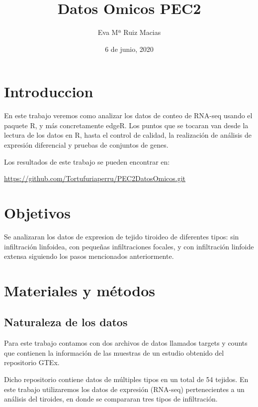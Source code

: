 \documentclass[
]{article}
\title{Datos Omicos PEC2}
\author{Eva Mª Ruiz Macias}
\date{6 de junio, 2020}
\begin{document}
\maketitle

{
\setcounter{tocdepth}{2}
\tableofcontents
}
\hypertarget{introduccion}{%
\section{Introduccion}\label{introduccion}}

En este trabajo veremos como analizar los datos de conteo de RNA-seq
usando el paquete R, y más concretamente edgeR. Los puntos que se
tocaran van desde la lectura de los datos en R, hasta el control de
calidad, la realización de análisis de expresión diferencial y pruebas
de conjuntos de genes.

Los resultados de este trabajo se pueden encontrar en:

\url{https://github.com/Tortufuriaperru/PEC2DatosOmicos.git}

\hypertarget{objetivos}{%
\section{Objetivos}\label{objetivos}}

Se analizaran los datos de expresion de tejido tiroideo de diferentes
tipos: sin infiltración linfoidea, con pequeñas infiltraciones focales,
y con infiltración linfoide extensa siguiendo los pasos mencionados
anteriormente.

\hypertarget{materiales-y-muxe9todos}{%
\section{Materiales y métodos}\label{materiales-y-muxe9todos}}

\hypertarget{naturaleza-de-los-datos}{%
\subsection{Naturaleza de los datos}\label{naturaleza-de-los-datos}}

Para este trabajo contamos con dos archivos de datos llamados targets y
counts que contienen la información de las muestras de un estudio
obtenido del repositorio GTEx.

Dicho repositorio contiene datos de múltiples tipos en un total de 54
tejidos. En este trabajo utilizaremos los datos de expresión (RNA-seq)
pertenecientes a un análisis del tiroides, en donde se compararan tres
tipos de infiltración.
\end{document}
